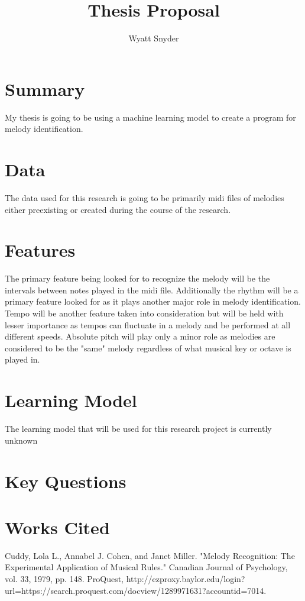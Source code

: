 \documentclass{article}
\title{Thesis Proposal}
\author{Wyatt Snyder}
\begin{document}
	\maketitle
	\section{Summary}
	My thesis is going to be using a machine learning model to create a program for melody identification. 
	
	\section{Data}
	The data used for this research is going to be primarily midi files of melodies either preexisting or created during the course of the research. 
	
	\section{Features}
	The primary feature being looked for to recognize the melody will be the intervals between notes played in the midi file. Additionally the rhythm will be a primary feature looked for as it plays another major role in melody identification. Tempo will be another feature taken into consideration but will be held with lesser importance as tempos can fluctuate in a melody and be performed at all different speeds. Absolute pitch will play only a minor role as melodies are considered to be the "same" melody regardless of what musical key or octave is played in.  
	   
	
	\section{Learning Model}
	The learning model that will be used for this research project is currently unknown 
	
	\section{Key Questions}
	
	\section{Works Cited}
	Cuddy, Lola L., Annabel J. Cohen, and Janet Miller. "Melody Recognition: The Experimental Application of Musical Rules." Canadian Journal of Psychology, vol. 33, 1979, pp. 148. ProQuest, http://ezproxy.baylor.edu/login?url=https://search.proquest.com/docview/1289971631?accountid=7014.
	
\end{document}
